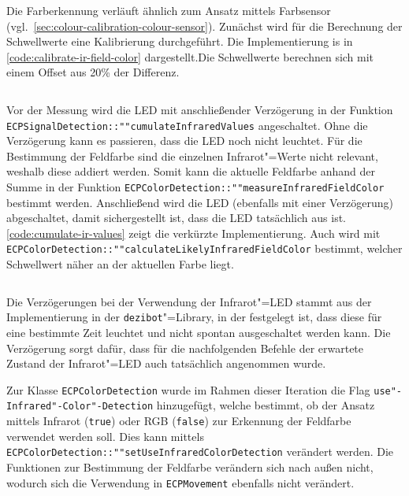 Die Farberkennung verläuft ähnlich zum Ansatz mittels Farbsensor (vgl.~\autoref{sec:colour-calibration-colour-sensor}). Zunächst wird für die Berechnung der Schwellwerte eine Kalibrierung durchgeführt. Die Implementierung is in \autoref{code:calibrate-ir-field-color} dargestellt.Die Schwellwerte berechnen sich mit einem Offset aus 20\% der Differenz. 

\begin{listing}[h]
    \inputminted{cpp}{../assets/code/ECPColorDetection-calibrateIRFieldColor.cpp}
    \caption{Verkürzter Code"=Ausschnitt zur \texttt{ECP"-Color"-Detection::""calibrate\-IR\-Field\-Color}"=Funktion.}
    \label{code:calibrate-ir-field-color}
\end{listing}

Vor der Messung wird die LED mit anschließender Verzögerung in der Funktion \texttt{ECP\-Signal\-Detection::""cumulate\-Infrared\-Values} angeschaltet. Ohne die Verzögerung kann es passieren, dass die LED noch nicht leuchtet. Für die Bestimmung der Feldfarbe sind die einzelnen Infrarot"=Werte nicht relevant, weshalb diese addiert werden. Somit kann die aktuelle Feldfarbe anhand der Summe in der Funktion \texttt{ECP\-Color\-Detection::""measure\-Infrared\-Field\-Color} bestimmt werden. Anschließend wird die LED (ebenfalls mit einer Verzögerung) abgeschaltet, damit sichergestellt ist, dass die LED tatsächlich aus ist. \autoref{code:cumulate-ir-values} zeigt die verkürzte Implementierung. Auch wird mit \texttt{ECP\-Color\-Detection::""calculate\-Likely\-Infrared\-Field\-Color} bestimmt, welcher Schwellwert näher an der aktuellen Farbe liegt.

\begin{listing}[h]
    \inputminted{cpp}{../assets/code/ECPSignalDetection-cumulateInfraredValues.cpp}
    \caption{Verkürzter Code"=Ausschnitt zur \texttt{ECP\-Signal\-Detection::""cumulate\-Infrared\-Values}"=Funktion.}
    \label{code:cumulate-ir-values}
\end{listing}

Die Verzögerungen bei der Verwendung der Infrarot"=LED stammt aus der Implementierung in der \texttt{dezibot}"=Library, in der festgelegt ist, dass diese für eine bestimmte Zeit leuchtet und nicht spontan ausgeschaltet werden kann. Die Verzögerung sorgt dafür, dass für die nachfolgenden Befehle der erwartete Zustand der Infrarot"=LED auch tatsächlich angenommen wurde.

Zur Klasse \texttt{ECP\-Color\-Detection} wurde im Rahmen dieser Iteration die Flag \texttt{use"-Infrared"-Color"-Detection} hinzugefügt, welche bestimmt, ob der Ansatz mittels Infrarot (\texttt{true}) oder RGB (\texttt{false}) zur Erkennung der Feldfarbe verwendet werden soll. Dies kann mittels \texttt{ECP\-Color\-Detection::""set\-Use\-Infrared\-Color\-Detection} verändert werden. Die Funktionen zur Bestimmung der Feldfarbe verändern sich nach außen nicht, wodurch sich die Verwendung in \texttt{ECP\-Movement} ebenfalls nicht verändert.

